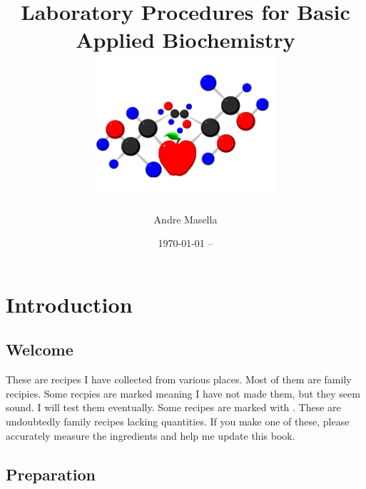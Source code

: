 \documentclass{book}
\begin{document}
\titlelabel{}
\pagestyle{fancy}
\fancyhf{}
\renewcommand{\chaptermark}[1]{\markboth{#1}{}}
 
\fancyhf{}
\fancyhead[LE,RO]{\thepage}
\fancyhead[RE]{\textit{\nouppercase{\leftmark}}}
\fancyhead[LO]{}

\thispagestyle{plain}


\title{Laboratory Procedures for Basic Applied Biochemistry \\
\includegraphics[width=0.5\textwidth,angle=-90]{CoverLogo} 
}
\author{ Andre Masella }
\date{\today{} -- }
\maketitle

\tableofcontents

\chapter{Introduction}

\section{Welcome}

These are recipes I have collected from various places. Most of them are
family recipies. Some recpies are marked \UNTESTED meaning I have not
made them, but they seem sound.  I will test them eventually. Some recipes are marked with \FIXME{}. These are undoubtedly family recipes lacking quantities. If you make one of these, please accurately measure the ingredients and help me update this book.\par

\section{Preparation}
\end{document}
